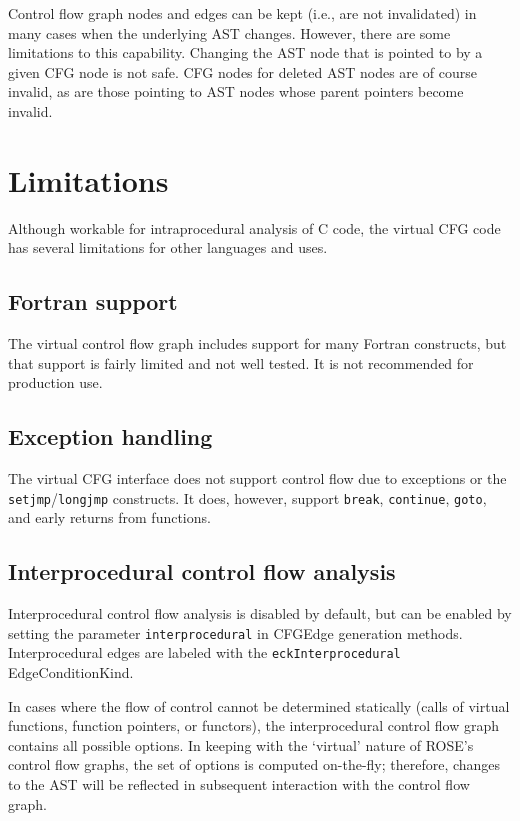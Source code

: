 Control flow graph nodes and edges can be kept (i.e., are not invalidated)
in many cases when the underlying AST changes.  However, there are some
limitations to this capability.  Changing the AST node that is pointed to
by a given CFG node is not safe.  CFG nodes for deleted AST nodes are of
course invalid, as are those pointing to AST nodes whose parent pointers
become invalid.

\section{Limitations}

Although workable for intraprocedural analysis of C code, the virtual CFG
code has several limitations for other languages and uses.

\subsection{Fortran support}

The virtual control flow graph includes support for many Fortran
constructs, but that support is fairly limited and not well tested.  It is
not recommended for production use.

\subsection{Exception handling}

The virtual CFG interface does not support control flow due to exceptions
or the \lstinline{setjmp}/\lstinline{longjmp} constructs.
It does, however, support \lstinline{break}, \lstinline{continue},
\lstinline{goto}, and early returns from functions.

\subsection{Interprocedural control flow analysis}

Interprocedural control flow analysis is disabled by default, but can be enabled
by setting the parameter \lstinline{interprocedural} in CFGEdge generation
methods. Interprocedural edges are labeled with the \lstinline{eckInterprocedural}
EdgeConditionKind.

In cases where the flow of control cannot be determined statically (calls of virtual
functions, function pointers, or functors), the interprocedural control flow
graph contains all possible options. In keeping with the `virtual' nature of
ROSE's control flow graphs, the set of options is computed on-the-fly;
therefore, changes to the AST will be reflected in subsequent interaction with
the control flow graph.  


